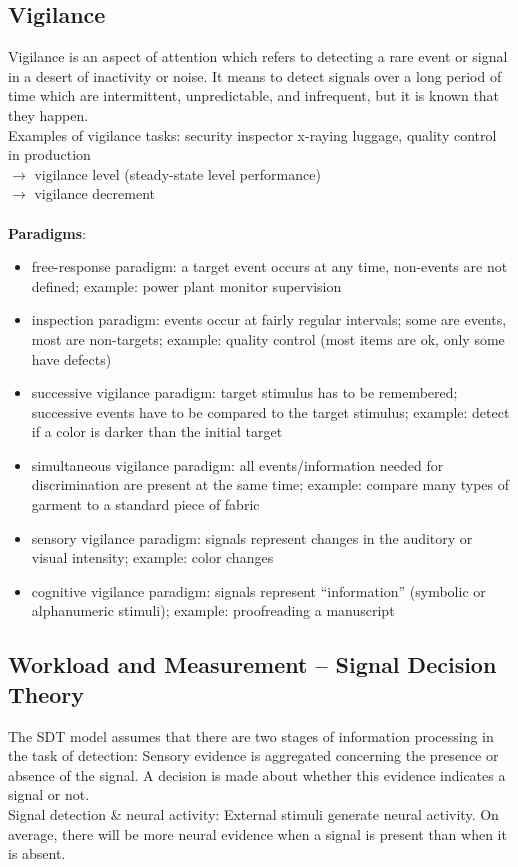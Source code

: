 \subsection{Vigilance}
Vigilance is an aspect of attention which refers to detecting a rare event or signal in a desert of inactivity or noise.
It means to detect signals over a long period of time which are intermittent, unpredictable, and infrequent, but it is known that they happen.\\
Examples of vigilance tasks: security inspector x-raying luggage, quality control in production\\
$\rightarrow$ vigilance level (steady-state level performance)\\
$\rightarrow$ vigilance decrement\\\\
\textbf{Paradigms}:
\begin{itemize}
\item free-response paradigm: a target event occurs at any time, non-events are not defined; example: power plant monitor supervision
\item inspection paradigm: events occur at fairly regular intervals; some are events, most are non-targets; example: quality control (most items are ok, only some have defects)
\item successive vigilance paradigm: target stimulus has to be remembered; successive events have to be compared to the target stimulus; example: detect if a color is darker than the initial target
\item simultaneous vigilance paradigm: all events/information needed for discrimination are present at the same time; example: compare many types of garment to a standard piece of fabric
\item sensory vigilance paradigm: signals represent changes in the auditory or visual intensity; example: color changes
\item cognitive vigilance paradigm: signals represent ``information'' (symbolic or alphanumeric stimuli); example: proofreading a manuscript
\end{itemize}

\subsection{Workload and Measurement -- Signal Decision Theory}
The SDT model assumes that there are two stages of information processing in the task of detection: Sensory evidence is aggregated concerning the presence or absence of the signal. A decision is made about whether this evidence indicates a signal or not.\\
Signal detection \& neural activity: External stimuli generate neural activity. On average, there will be more neural evidence when a signal is present than when it is absent.\\

